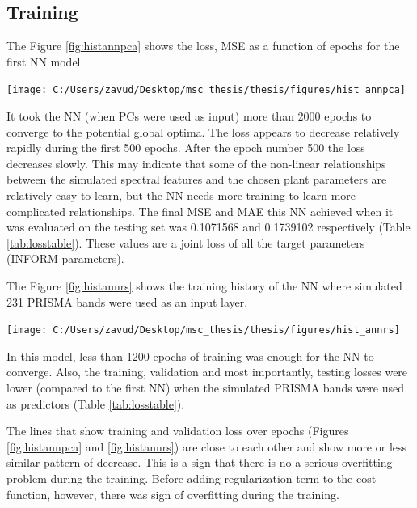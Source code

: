 \documentclass[a4paper, twoside]{templates/ociamthesis}
\let\origfigure\figure
\let\endorigfigure\endfigure
\renewenvironment{figure}[1][2] {
    \expandafter\origfigure\expandafter[H]
} {
    \endorigfigure
}
\begin{document}
\hypertarget{training}{%
\subsection{Training}\label{training}}

The Figure \ref{fig:histannpca} shows the loss, MSE as a function of epochs for the first NN model.

\begin{figure}
\texttt{[image: C:/Users/zavud/Desktop/msc\_thesis/thesis/figures/hist\_annpca]} \caption{Training history of ANN with PCs}\label{fig:histannpca}
\end{figure}

It took the NN (when PCs were used as input) more than 2000 epochs to converge to the potential global optima. The loss appears to decrease relatively rapidly during the first 500 epochs. After the epoch number 500 the loss decreases slowly. This may indicate that some of the non-linear relationships between the simulated spectral features and the chosen plant parameters are relatively easy to learn, but the NN needs more training to learn more complicated relationships. The final MSE and MAE this NN achieved when it was evaluated on the testing set was 0.1071568 and 0.1739102 respectively (Table \ref{tab:losstable}). These values are a joint loss of all the target parameters (INFORM parameters).

The Figure \ref{fig:histannrs} shows the training history of the NN where simulated 231 PRISMA bands were used as an input layer.

\begin{figure}
\texttt{[image: C:/Users/zavud/Desktop/msc\_thesis/thesis/figures/hist\_annrs]} \caption{Training history of ANN with simulated PRISMA bands}\label{fig:histannrs}
\end{figure}

In this model, less than 1200 epochs of training was enough for the NN to converge. Also, the training, validation and most importantly, testing losses were lower (compared to the first NN) when the simulated PRISMA bands were used as predictors (Table \ref{tab:losstable}).

The lines that show training and validation loss over epochs (Figures \ref{fig:histannpca} and \ref{fig:histannrs}) are close to each other and show more or less similar pattern of decrease. This is a sign that there is no a serious overfitting problem during the training. Before adding regularization term to the cost function, however, there was sign of overfitting during the training.
\end{document}
